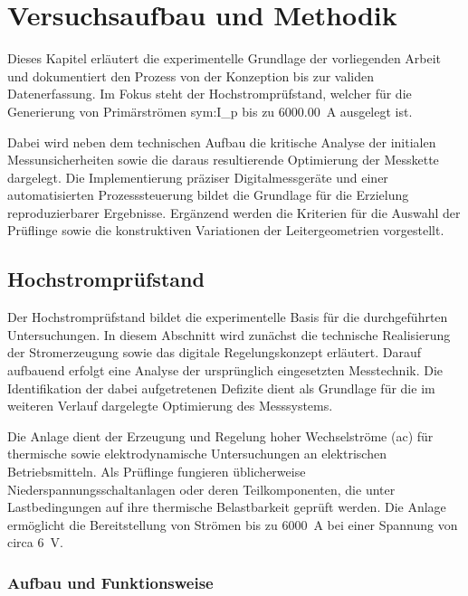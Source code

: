 


\section{Versuchsaufbau und Methodik}
\label{chap:methodik}

Dieses Kapitel erläutert die experimentelle Grundlage der vorliegenden Arbeit und dokumentiert den Prozess von der Konzeption bis zur validen Datenerfassung. Im Fokus steht der Hochstromprüfstand, welcher für die Generierung von Primärströmen \gls{sym:I_p} bis zu \SI{6000,00}{\ampere} ausgelegt ist. 

Dabei wird neben dem technischen Aufbau die kritische Analyse der initialen Messunsicherheiten sowie die daraus resultierende Optimierung der Messkette dargelegt. Die Implementierung präziser Digitalmessgeräte und einer automatisierten Prozesssteuerung bildet die Grundlage für die Erzielung reproduzierbarer Ergebnisse. Ergänzend werden die Kriterien für die Auswahl der Prüflinge sowie die konstruktiven Variationen der Leitergeometrien vorgestellt.

\subsection{Hochstromprüfstand}
\label{sec:hochstrom_pruefstand}

Der Hochstromprüfstand bildet die experimentelle Basis für die durchgeführten Untersuchungen. In diesem Abschnitt wird zunächst die technische Realisierung der Stromerzeugung sowie das digitale Regelungskonzept erläutert. Darauf aufbauend erfolgt eine Analyse der ursprünglich eingesetzten Messtechnik. Die Identifikation der dabei aufgetretenen Defizite dient als Grundlage für die im weiteren Verlauf dargelegte Optimierung des Messsystems.

Die Anlage dient der Erzeugung und Regelung hoher Wechselströme (\gls{ac}) für thermische sowie elektrodynamische Untersuchungen an elektrischen Betriebsmitteln. Als Prüflinge fungieren üblicherweise Niederspannungsschaltanlagen oder deren Teilkomponenten, die unter Lastbedingungen auf ihre thermische Belastbarkeit geprüft werden. Die Anlage ermöglicht die Bereitstellung von Strömen bis zu \SI{6000}{A} bei einer Spannung von circa \SI{6}{V}.

\subsubsection{Aufbau und Funktionsweise}
\label{sec:aufbau_funktionsweise}

